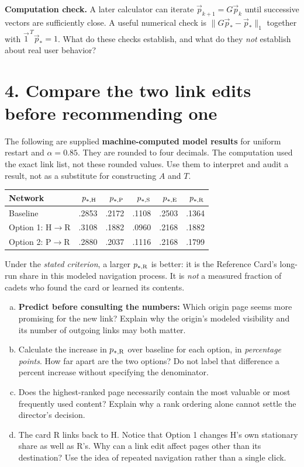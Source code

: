 \documentclass[10pt,letterpaper]{article}
\begin{document}
\textbf{Computation check.} A later calculator can iterate $\vec p_{k+1}=G\vec p_k$ until successive vectors are sufficiently close. A useful numerical check is $\|G\vec p_*-\vec p_*\|_1$ together with $\vec 1^{\,T}\vec p_*=1$. What do these checks establish, and what do they \emph{not} establish about real user behavior?\\[0.44in]

\newpage
\section*{4. Compare the two link edits before recommending one}
The following are supplied \textbf{machine-computed model results} for uniform restart and $\alpha=0.85$. They are rounded to four decimals. The computation used the exact link list, not these rounded values. Use them to interpret and audit a result, not as a substitute for constructing $A$ and $T$.
\begin{center}
\begin{tabular}{@{}lrrrrr@{}}
\toprule
Network & $p_{*,\rm H}$ & $p_{*,\rm P}$ & $p_{*,\rm S}$ & $p_{*,\rm E}$ & $p_{*,\rm R}$\\
\midrule
Baseline & .2853 & .2172 & .1108 & .2503 & .1364\\
Option 1: H$\to$R & .3108 & .1882 & .0960 & .2168 & .1882\\
Option 2: P$\to$R & .2880 & .2037 & .1116 & .2168 & .1799\\
\bottomrule
\end{tabular}
\end{center}
Under the \emph{stated criterion}, a larger $p_{*,\rm R}$ is better: it is the Reference Card's long-run share in this modeled navigation process. It is \emph{not} a measured fraction of cadets who found the card or learned its contents.

\begin{enumerate}[a.,leftmargin=*]
\item \textbf{Predict before consulting the numbers:} Which origin page seems more promising for the new link? Explain why the origin's modeled visibility and its number of outgoing links may both matter.\\[0.43in]
\item Calculate the increase in $p_{*,\rm R}$ over baseline for each option, in \emph{percentage points}. How far apart are the two options? Do not label that difference a percent increase without specifying the denominator.\\[0.54in]
\item Does the highest-ranked page necessarily contain the most valuable or most frequently used content? Explain why a rank ordering alone cannot settle the director's decision.\\[0.47in]
\item The card R links back to H. Notice that Option 1 changes H's own stationary share as well as R's. Why can a link edit affect pages other than its destination? Use the idea of repeated navigation rather than a single click.\\[0.55in]
\end{enumerate}
\end{document}
